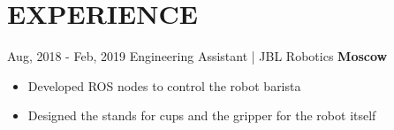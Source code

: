 \documentclass[]{friggeri-cv_reccius-experiment}
\begin{document}
\section{EXPERIENCE}
\begin{entrylist}

  \entry
    {Aug, 2018 - Feb, 2019\enspace}
    {Engineering Assistant | }{\small JBL Robotics}
    {\normalsize\textbf{\color{ipsgreen}\faMapMarker\space Moscow}}
    {\jobspace
    \begin{itemize}[leftmargin=*, itemsep = 0.1em]
    \item Developed ROS nodes to control the robot barista
    \item Designed the stands for cups  and the gripper for the robot itself\\
    \end{itemize}
    }
    
    
\end{entrylist}
\end{document}
